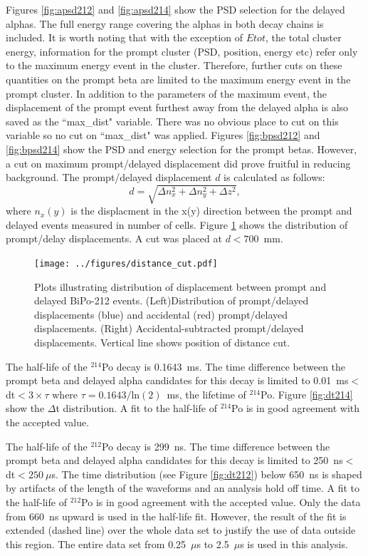 Figures \ref{fig:apsd212} and \ref{fig:apsd214} show the PSD selection for the delayed alphas. The full energy range covering the alphas in both decay chains is included.
It is worth noting that with the exception of $Etot$, the total cluster energy, information for the prompt cluster (PSD, position, energy etc) refer only to the maximum energy event in the cluster. Therefore, further cuts on these quantities on the prompt beta are limited to the maximum energy event in the prompt cluster. In addition to the parameters of the maximum event, the displacement of the prompt event furthest away from the delayed alpha is also saved as the ``max\_dist" variable. There was no obvious place to cut on this variable so no cut on ``max\_dist" was applied. Figures \ref{fig:bpsd212} and \ref{fig:bpsd214} show the PSD and energy selection for the prompt betas. 
However, a cut on maximum prompt/delayed displacement did prove fruitful in reducing background. The prompt/delayed displacement $d$ is calculated as follows:
\[
d=\sqrt{\Delta n_x^2+\Delta n_y^2 + \Delta z^2},
\]
where $n_x(y)$ is the displacment in the x(y) direction between the prompt and delayed events measured in number of cells. Figure \ref{fig:deltaD} shows the distribution of prompt/delay displacements. A cut was placed at $d<700$~mm.
\begin{figure}[ht]
\centering
\texttt{[image: ../figures/distance\_cut.pdf]}
\caption{\label{fig:deltaD}Plots illustrating distribution of displacement between prompt and delayed BiPo-212 events. (Left)Distribution of prompt/delayed displacements (blue) and accidental (red) prompt/delayed displacements. (Right) Accidental-subtracted prompt/delayed displacements. Vertical line shows position of distance cut.}
\end{figure}

The half-life of the $^{214}$Po decay is 0.1643~ms. The time difference between the prompt beta and delayed alpha candidates for this decay is limited to 0.01~ms$<$dt$<3\times\tau$ where $\tau=0.1643/\textrm{ln}(2)$~ms, the lifetime of $^{214}$Po. Figure \ref{fig:dt214} show the $\Delta$t distribution. A fit to the half-life of $^{214}$Po is in good agreement with the accepted value.

The half-life of the $^{212}$Po decay is 299~ns. The time difference between the prompt beta and delayed alpha candidates for this decay is limited to 250~ns$<$dt$<250~\mu$s. The time distribution (see Figure \ref{fig:dt212}) below 650~ns is shaped by artifacts of the length of the waveforms and an analysis hold off time.  A fit to the half-life of $^{212}$Po is in good agreement with the accepted value. Only the data from 660~ns upward is used in the half-life fit. However, the result of the fit is extended (dashed line) over the whole data set to justify the use of data outside this region. The entire data set from 0.25~$\mu$s to 2.5~$\mu$s is used in this analysis. 

